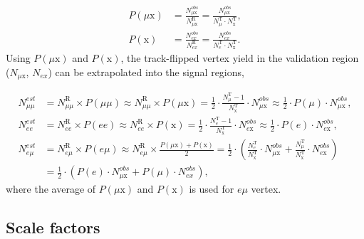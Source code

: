 \begin{align}
P(\mu\mathrm{x}) &= \frac{N_{\mu\mathrm{x}}^{obs}}{N^{\mathrm{R}}_{\mu\mathrm{x}}} = \frac{N_{\mu\mathrm{x}}^{obs}}{N^{\mathrm{T}}_{\mu} \cdot N^{\mathrm{T}}_{\mathrm{x}}}, \nonumber\\
P(\mathrm{x}) &= \frac{N_{ex}^{obs}}{N^{\mathrm{R}}_{ex}} = \frac{N_{ex}^{obs}}{N^{\mathrm{T}}_{e} \cdot N^{\mathrm{T}}_{\mathrm{x}}}.
\end{align}
%
Using $P(\mu\mathrm{x})$ and $P(\mathrm{x})$, the track-flipped vertex yield in the validation region ($N_{\mu\mathrm{x}}$, $N_{ex}$) can be extrapolated into the signal regions,

\begin{align}
\label{eq:TF_extrapolation_from_validation}
N_{\mu\mu}^{est}&= N^{\mathrm{R}}_{\mu\mu} \times P(\mu\mu) \approx N^{\mathrm{R}}_{\mu\mu} \times P(\mu\mathrm{x})  = \frac{1}{2} \cdot \frac{N^{\mathrm{T}}_{\mu}-1}{N^{\mathrm{T}}_{\mathrm{x}}} \cdot N_{\mu\mathrm{x}}^{obs} \approx \frac{1}{2} \cdot P(\mu) \cdot N_{\mu\mathrm{x}}^{obs}, \nonumber \\
N_{ee}^{est}    &= N^{\mathrm{R}}_{ee} \times P(ee) \approx N^{\mathrm{R}}_{ee} \times P(\mathrm{x}) = \frac{1}{2} \cdot \frac{N^{\mathrm{T}}_{e}-1}{N^{\mathrm{T}}_{\mathrm{x}}} \cdot N_{e \mathrm{x}}^{obs} \approx \frac{1}{2} \cdot P(e) \cdot N_{e \mathrm{x}}^{obs}, \nonumber \\
N_{e \mu}^{est} &= N^{\mathrm{R}}_{e \mu} \times P(e \mu) \approx N^{\mathrm{R}}_{e \mu} \times \frac{P(\mu\mathrm{x}) + P(\mathrm{x})}{2} = \frac{1}{2} \cdot (\frac{N^{\mathrm{T}}_{e}}{N^{\mathrm{T}}_{\mathrm{x}}} \cdot N_{\mu\mathrm{x}}^{obs} + \frac{N^{\mathrm{T}}_{\mu}}{N^{\mathrm{T}}_{\mathrm{x}}} \cdot N_{e \mathrm{x}}^{obs}) \nonumber \\
&= \frac{1}{2} \cdot (P(e) \cdot N_{\mu\mathrm{x}}^{obs} + P(\mu) \cdot N_{ex}^{obs}),
\end{align}
%
where the average of $P(\mu\mathrm{x})$ and $P(\mathrm{x})$ is used for $e \mu$ vertex.


\subsection{Scale factors}

